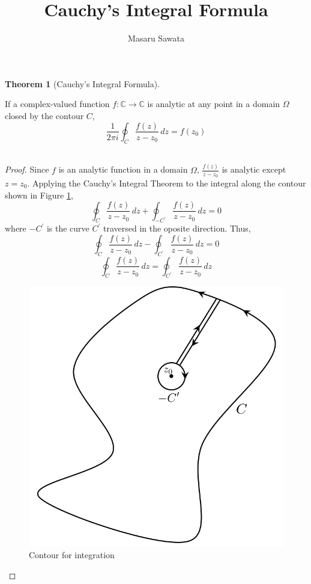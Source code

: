 \documentclass[letterpaper, 12pt]{article}
\title{Cauchy's Integral Formula}
\author{Masaru Sawata}
\theoremstyle{custom}
\newtheorem*{theorem}{Theorem}
\begin{document}
\maketitle
\begin{theorem}[Cauchy's Integral Formula]
\end{theorem}
If a complex-valued function $f: \mathbb{C} \rightarrow \mathbb{C}$ is analytic at any point in a domain $\Omega$ closed by the contour $C$,
\begin{equation*}
  \frac{1}{2\pi i}\oint_C \frac{f(z)}{z - z_0} \, dz = f(z_0)
\end{equation*}\\

\begin{proof}
  Since $f$ is an analytic function in a domain $\Omega$, 
  $\displaystyle \frac{f(z)}{z - z_0}$ is analytic except $z = z_0$.
  Applying the Cauchy's Integral Theorem to the integral along the contour shown in Figure \ref{fig3}, 
  \begin{equation*}
    \oint_C \frac{f(z)}{z - z_0} \, dz + \oint_{-C^\prime} \frac{f(z)}{z - z_0} \, dz = 0
  \end{equation*}
  where $-C^\prime$ is the curve $C^\prime$ traversed in the oposite direction. Thus,
  \begin{equation*}
    \oint_C \frac{f(z)}{z - z_0} \, dz - \oint_{C^\prime} \frac{f(z)}{z - z_0} \, dz = 0
  \end{equation*}
  \begin{equation*}
    \oint_C \frac{f(z)}{z - z_0} \, dz = \oint_{C^\prime} \frac{f(z)}{z - z_0} \, dz
  \end{equation*}


  \begin{figure}[htbp]
    \centering
    \includegraphics[width=.5\columnwidth]{Contour3.png}
    \caption{Contour for integration}
    \label{fig3}
  \end{figure}


\end{proof}
\end{document}

